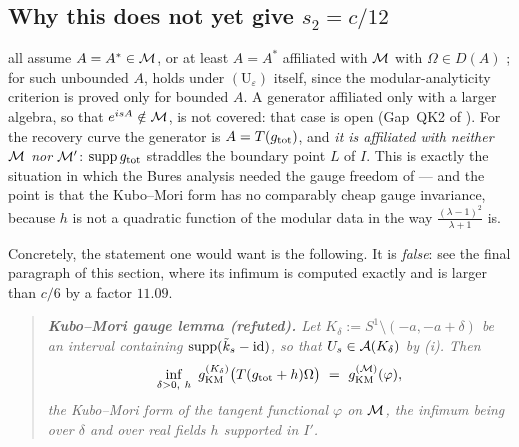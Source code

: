 \subsection{Why this does not yet give $s_{2}=c/12$}

 all assume $A=A^{*}\in\mathcal M$, or at least $A=A^{*}$ affiliated with $\mathcal M$ with $\Omega\in D(A)$ \cite[Prop.~8.1]{RigorKM}; for such unbounded $A$,  holds under $(\mathrm U_{\varepsilon})$ itself, since the modular-analyticity criterion is proved only for bounded $A$.  A generator affiliated only with a larger algebra, so that $e^{isA}\notin\mathcal M$, is not covered: that case is open (Gap~QK2 of \cite{RigorKM}).
For the recovery curve the generator is $A=T(g_{\rm tot})$, and \emph{it is affiliated with neither $\mathcal M$
nor $\mathcal M'$}: $\operatorname{supp} g_{\rm tot}$ straddles the boundary point $L$ of $I$.  This is exactly the situation in
which the Bures analysis needed the gauge freedom of  --- and the point is that the
Kubo--Mori form has no comparably cheap gauge invariance, because $h$ is not a quadratic function of the
modular data in the way $\frac{(\lambda-1)^{2}}{\lambda+1}$ is.

Concretely, the statement one would want is the following.  It is \emph{false}: see the final paragraph
of this section, where its infimum is computed exactly and is larger than $c/6$ by a factor $11.09$.

\begin{quote}\itshape
\textbf{Kubo--Mori gauge lemma (refuted).}  Let $K_{\delta}:=S^{1}\setminus(-a,-a+\delta)$ be an interval
containing $\operatorname{supp}(\tilde k_{s}-\mathrm{id})$, so that $U_{s}\in\mathcal A(K_{\delta})$ by (i).  Then
\[
 \inf_{\delta>0,\ h}\ \gKM^{(K_{\delta})}\bigl(T(g_{\rm tot}+h)\Omega\bigr)
 \ =\ \gKM^{(\cM)}(\varphi),
\]
the Kubo--Mori form of the tangent functional $\varphi$ on $\mathcal M$, the infimum being over $\delta$ and over
real fields $h$ supported in $I'$.
\end{quote}

